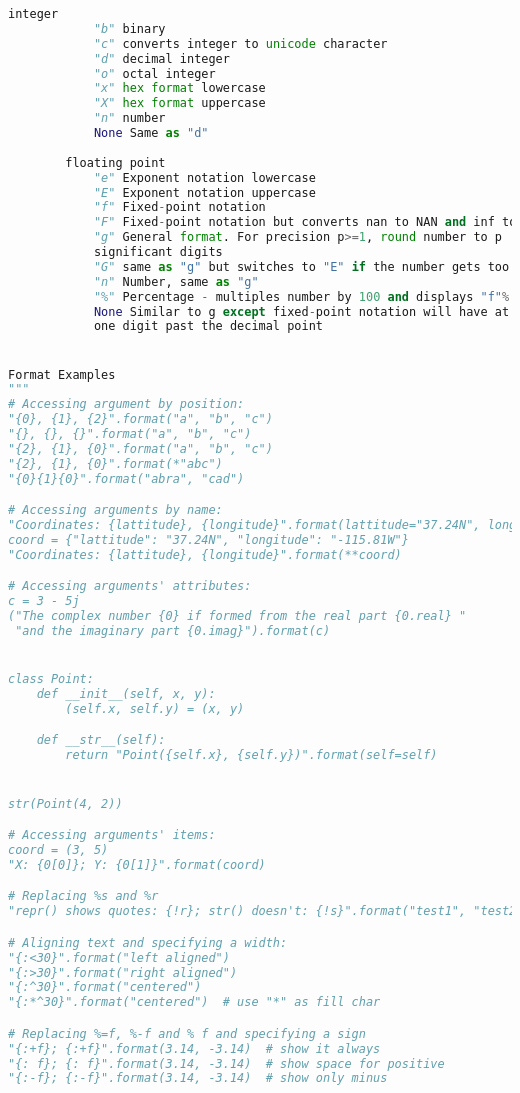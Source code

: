 \documentclass[a4paper,landscape]{report}
\begin{document}
\begin{lstlisting}[language=Python]
        integer
            "b" binary
            "c" converts integer to unicode character
            "d" decimal integer
            "o" octal integer
            "x" hex format lowercase
            "X" hex format uppercase
            "n" number
            None Same as "d"
        
        floating point
            "e" Exponent notation lowercase
            "E" Exponent notation uppercase
            "f" Fixed-point notation
            "F" Fixed-point notation but converts nan to NAN and inf to INF
            "g" General format. For precision p>=1, round number to p 
            significant digits
            "G" same as "g" but switches to "E" if the number gets too large
            "n" Number, same as "g"
            "%" Percentage - multiples number by 100 and displays "f"%
            None Similar to g except fixed-point notation will have at least
            one digit past the decimal point


Format Examples
"""
# Accessing argument by position:
"{0}, {1}, {2}".format("a", "b", "c")
"{}, {}, {}".format("a", "b", "c")
"{2}, {1}, {0}".format("a", "b", "c")
"{2}, {1}, {0}".format(*"abc")
"{0}{1}{0}".format("abra", "cad")

# Accessing arguments by name:
"Coordinates: {lattitude}, {longitude}".format(lattitude="37.24N", longitude="-115.81W")
coord = {"lattitude": "37.24N", "longitude": "-115.81W"}
"Coordinates: {lattitude}, {longitude}".format(**coord)

# Accessing arguments' attributes:
c = 3 - 5j
("The complex number {0} if formed from the real part {0.real} "
 "and the imaginary part {0.imag}").format(c)


class Point:
    def __init__(self, x, y):
        (self.x, self.y) = (x, y)

    def __str__(self):
        return "Point({self.x}, {self.y})".format(self=self)


str(Point(4, 2))

# Accessing arguments' items:
coord = (3, 5)
"X: {0[0]}; Y: {0[1]}".format(coord)

# Replacing %s and %r
"repr() shows quotes: {!r}; str() doesn't: {!s}".format("test1", "test2")

# Aligning text and specifying a width:
"{:<30}".format("left aligned")
"{:>30}".format("right aligned")
"{:^30}".format("centered")
"{:*^30}".format("centered")  # use "*" as fill char

# Replacing %=f, %-f and % f and specifying a sign
"{:+f}; {:+f}".format(3.14, -3.14)  # show it always
"{: f}; {: f}".format(3.14, -3.14)  # show space for positive
"{:-f}; {:-f}".format(3.14, -3.14)  # show only minus


\end{lstlisting}
\end{document}

